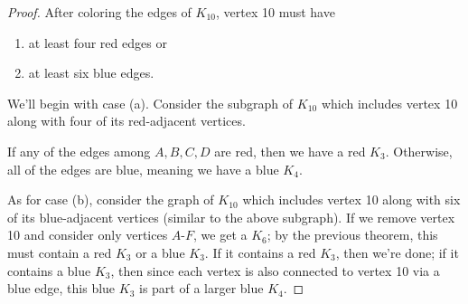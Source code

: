 \documentclass[../m055main.tex]{subfiles}
\begin{document}
\begin{proof}
    After coloring the edges of $K_{10}$, vertex 10 must have
    \begin{enumerate}[label=(\alph*)]
        \item at least four red edges or
        \item at least six blue edges.
    \end{enumerate}
    We'll begin with case (a).
    Consider the subgraph of $K_{10}$ which includes vertex 10 along with four of its red-adjacent vertices.

    \begin{center}
    \end{center}

    If any of the edges among $A,B,C,D$ are red, then we have a red $K_3$.
    Otherwise, all of the edges are blue, meaning we have a blue $K_4$.

    As for case (b), consider the graph of $K_{10}$ which includes vertex 10 along with six of its blue-adjacent vertices (similar to the above subgraph).
    If we remove vertex 10 and consider only vertices $A$-$F$, we get a $K_6$; by the previous theorem, this must contain a red $K_3$ or a blue $K_3$.
    If it contains a red $K_3$, then we're done; if it contains a blue $K_3$, then since each vertex is also connected to vertex 10 via a blue edge, this blue $K_3$ is part of a larger blue $K_4$.
\end{proof}
\end{document}
